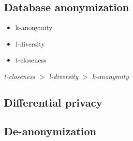 \documentclass[../overview.tex]{subfiles}
\begin{document}
\subsection{Database anonymization}
\begin{itemize}
	\item k-anonymity
	\item l-diversity
	\item t-closeness
\end{itemize}
\emph{t-closeness $>$ l-diversity $>$ k-anonymity}

\subsection{Differential privacy}

\subsection{De-anonymization}
\end{document}
